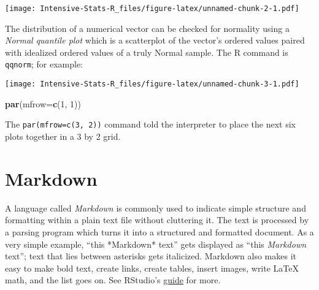 \documentclass[]{book}
\newenvironment{Shaded}{\begin{snugshade}}{\end{snugshade}}
\newcommand{\ControlFlowTok}[1]{\textcolor[rgb]{0.13,0.29,0.53}{\textbf{#1}}}
\newcommand{\DataTypeTok}[1]{\textcolor[rgb]{0.13,0.29,0.53}{#1}}
\newcommand{\DecValTok}[1]{\textcolor[rgb]{0.00,0.00,0.81}{#1}}
\newcommand{\KeywordTok}[1]{\textcolor[rgb]{0.13,0.29,0.53}{\textbf{#1}}}
\newcommand{\NormalTok}[1]{#1}
\newcommand{\OperatorTok}[1]{\textcolor[rgb]{0.81,0.36,0.00}{\textbf{#1}}}
\newcommand{\StringTok}[1]{\textcolor[rgb]{0.31,0.60,0.02}{#1}}
\theoremstyle{definition}
\theoremstyle{definition}
\theoremstyle{definition}
\theoremstyle{remark}
\begin{document}
\texttt{[image: Intensive-Stats-R\_files/figure-latex/unnamed-chunk-2-1.pdf]}

The distribution of a numerical vector can be checked for normality
using a \emph{Normal quantile plot} which is a scatterplot of the
vector's ordered values paired with idealized ordered values of a truly
Normal sample. The R command is \texttt{qqnorm}; for example:

\begin{Shaded}
\end{Shaded}

\texttt{[image: Intensive-Stats-R\_files/figure-latex/unnamed-chunk-3-1.pdf]}

\begin{Shaded}
\begin{Highlighting}[]
\KeywordTok{par}\NormalTok{(}\DataTypeTok{mfrow=}\KeywordTok{c}\NormalTok{(}\DecValTok{1}\NormalTok{, }\DecValTok{1}\NormalTok{))}
\end{Highlighting}
\end{Shaded}

The \texttt{par(mfrow=c(3,\ 2))} command told the interpreter to place
the next six plots together in a 3 by 2 grid.

\hypertarget{markdown}{%
\chapter{Markdown}\label{markdown}}

A language called \emph{Markdown} is commonly used to indicate simple
structure and formatting within a plain text file without cluttering it.
The text is processed by a parsing program which turns it into a
structured and formatted document. As a very simple example, ``this
*Markdown* text'' gets displayed as ``this \emph{Markdown} text''; text
that lies between asterisks gets italicized. Markdown also makes it easy
to make bold text, create links, create tables, insert images, write
LaTeX math, and the list goes on. See RStudio's
\href{https://rmarkdown.rstudio.com/authoring_pandoc_markdown.html}{guide}
for more.
\end{document}
